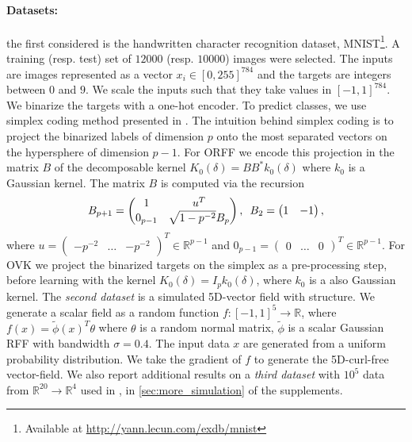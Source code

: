 \documentclass[twocolumn]{article}
\begin{document}
\paragraph{Datasets:}
the first considered is the handwritten character recognition dataset,
MNIST\footnote{Available at \url{http://yann.lecun.com/exdb/mnist}}.  A
training (resp. test) set of $12000$ (resp. $10000$) images were selected. The
inputs are images represented as a vector $x_i\in[0,255]^{784}$ and the targets
are integers between $0$ and $9$. We scale the inputs such that they take
values in $[-1,1]^{784}$. We binarize the targets with a one-hot encoder. To
predict classes, we use simplex coding method presented in
\cite{mroueh2012multiclass}. The intuition behind simplex coding is to project
the binarized labels of dimension $p$ onto the most separated vectors on the
hypersphere of dimension $p-1$. For ORFF we encode this projection in the
matrix $B$ of the decomposable kernel $K_0(\delta)=B B^* k_0(\delta)$ where
$k_0$ is a Gaussian kernel. The matrix $B$ is computed via the recursion
\begin{equation*}
    B_{p+1}=
    \begin{pmatrix} 
        1 & u^T \\
        0_{p-1} & \sqrt{1-p^{-2}}B_p
    \end{pmatrix},
    \enskip B_2 = \begin{pmatrix}1 & -1 \end{pmatrix},
\end{equation*}
where $u=\begin{pmatrix} -p^{-2} & \hdots & -p^{-2}
\end{pmatrix}^T\in\mathbb{R}^{p-1}$ and $0_{p-1} = \begin{pmatrix} 0 & \hdots &
0 \end{pmatrix}^T \in\mathbb{R}^{p-1}$. For OVK we project the binarized
targets on the simplex as a pre-processing step, before learning with the
kernel $K_0(\delta)=I_p k_0(\delta)$, where $k_0$ is a also Gaussian kernel.
The {\it second dataset} is a simulated 5D-vector field with structure. We
generate a scalar field as a random function $f:[-1,1]^5\to\mathbb{R}$, where
$f(x)=\tilde{\phi}(x)^T\theta$ where $\theta$ is a random normal matrix,
$\tilde{\phi}$ is a scalar Gaussian RFF with bandwidth $\sigma=0.4$. The input
data $x$ are generated from a uniform probability distribution. We take the
gradient of $f$ to generate the 5D-curl-free vector-field.  We also report
additional results on a {\it third dataset} with $10^5$ data from
$\mathbb{R}^{20}\to\mathbb{R}^4$ used in \cite{audiffren2013online}, in
\cref{sec:more_simulation} of the supplements.
\end{document}
